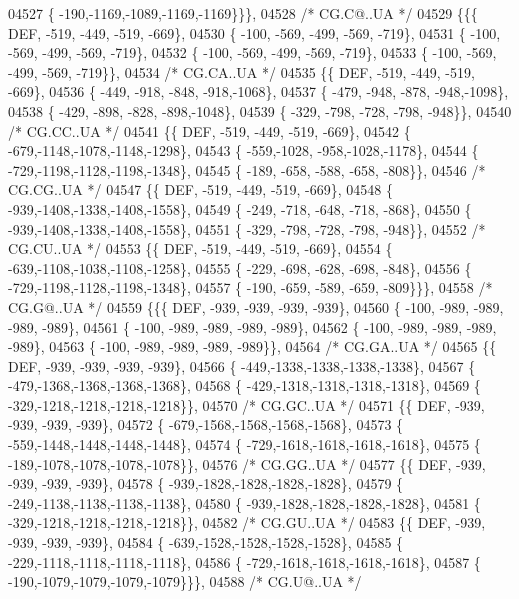\begin{DoxyCode}
04527 \{ -190,-1169,-1089,-1169,-1169\}\}\},
04528 \textcolor{comment}{/* CG.C@..UA */}
04529 \{\{\{  DEF, -519, -449, -519, -669\},
04530 \{ -100, -569, -499, -569, -719\},
04531 \{ -100, -569, -499, -569, -719\},
04532 \{ -100, -569, -499, -569, -719\},
04533 \{ -100, -569, -499, -569, -719\}\},
04534 \textcolor{comment}{/* CG.CA..UA */}
04535 \{\{  DEF, -519, -449, -519, -669\},
04536 \{ -449, -918, -848, -918,-1068\},
04537 \{ -479, -948, -878, -948,-1098\},
04538 \{ -429, -898, -828, -898,-1048\},
04539 \{ -329, -798, -728, -798, -948\}\},
04540 \textcolor{comment}{/* CG.CC..UA */}
04541 \{\{  DEF, -519, -449, -519, -669\},
04542 \{ -679,-1148,-1078,-1148,-1298\},
04543 \{ -559,-1028, -958,-1028,-1178\},
04544 \{ -729,-1198,-1128,-1198,-1348\},
04545 \{ -189, -658, -588, -658, -808\}\},
04546 \textcolor{comment}{/* CG.CG..UA */}
04547 \{\{  DEF, -519, -449, -519, -669\},
04548 \{ -939,-1408,-1338,-1408,-1558\},
04549 \{ -249, -718, -648, -718, -868\},
04550 \{ -939,-1408,-1338,-1408,-1558\},
04551 \{ -329, -798, -728, -798, -948\}\},
04552 \textcolor{comment}{/* CG.CU..UA */}
04553 \{\{  DEF, -519, -449, -519, -669\},
04554 \{ -639,-1108,-1038,-1108,-1258\},
04555 \{ -229, -698, -628, -698, -848\},
04556 \{ -729,-1198,-1128,-1198,-1348\},
04557 \{ -190, -659, -589, -659, -809\}\}\},
04558 \textcolor{comment}{/* CG.G@..UA */}
04559 \{\{\{  DEF, -939, -939, -939, -939\},
04560 \{ -100, -989, -989, -989, -989\},
04561 \{ -100, -989, -989, -989, -989\},
04562 \{ -100, -989, -989, -989, -989\},
04563 \{ -100, -989, -989, -989, -989\}\},
04564 \textcolor{comment}{/* CG.GA..UA */}
04565 \{\{  DEF, -939, -939, -939, -939\},
04566 \{ -449,-1338,-1338,-1338,-1338\},
04567 \{ -479,-1368,-1368,-1368,-1368\},
04568 \{ -429,-1318,-1318,-1318,-1318\},
04569 \{ -329,-1218,-1218,-1218,-1218\}\},
04570 \textcolor{comment}{/* CG.GC..UA */}
04571 \{\{  DEF, -939, -939, -939, -939\},
04572 \{ -679,-1568,-1568,-1568,-1568\},
04573 \{ -559,-1448,-1448,-1448,-1448\},
04574 \{ -729,-1618,-1618,-1618,-1618\},
04575 \{ -189,-1078,-1078,-1078,-1078\}\},
04576 \textcolor{comment}{/* CG.GG..UA */}
04577 \{\{  DEF, -939, -939, -939, -939\},
04578 \{ -939,-1828,-1828,-1828,-1828\},
04579 \{ -249,-1138,-1138,-1138,-1138\},
04580 \{ -939,-1828,-1828,-1828,-1828\},
04581 \{ -329,-1218,-1218,-1218,-1218\}\},
04582 \textcolor{comment}{/* CG.GU..UA */}
04583 \{\{  DEF, -939, -939, -939, -939\},
04584 \{ -639,-1528,-1528,-1528,-1528\},
04585 \{ -229,-1118,-1118,-1118,-1118\},
04586 \{ -729,-1618,-1618,-1618,-1618\},
04587 \{ -190,-1079,-1079,-1079,-1079\}\}\},
04588 \textcolor{comment}{/* CG.U@..UA */}

\end{DoxyCode}
